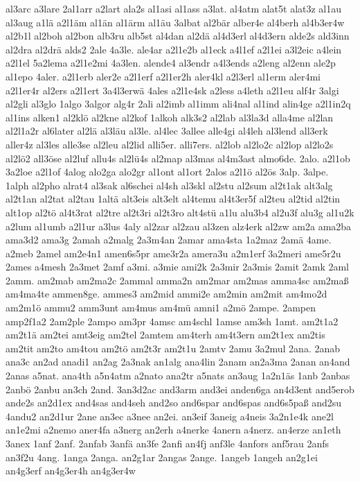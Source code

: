 {al3arc
a3lare
2al1arr
a2lart
ala2s
al1asi
al1ass
a3lat.
al4atm
alat5t
alat3z
al1au
al3aug
a1lä
a2l1äm
al1än
al1ärm
al1äu
3albat
al2bär
alber4e
al4berh
al4b3er4w
al2b1l
al2boh
al2bon
alb3ru
alb5st
al4dan
al2dä
al4d3erl
al4d3ern
alde2s
ald3inn
al2dra
al2drä
alds2
2ale
4a3le.
ale4ar
a2l1e2b
al1eck
a4l1ef
a2l1ei
a3l2eic
a4lein
a2l1el
5a2lema
a2l1e2mi
4a3len.
alende4
al3endr
a4l3ends
a2leng
al2enn
ale2p
al1epo
4aler.
a2l1erb
aler2e
a2l1erf
a2l1er2h
aler4kl
a2l3erl
al1erm
aler4mi
a2l1er4r
al2ers
a2l1ert
3a4l3erwä
4ales
a2l1e4sk
a2less
a4leth
a2l1eu
alf4r
3algi
al2gli
al3glo
1algo
3algor
alg4r
2ali
al2imb
al1imm
ali4nal
al1ind
alin4ge
a2l1in2q
al1ins
alken1
al2klö
al2kne
al2kof
1alkoh
alk3s2
al2lab
al3la3d
alla4me
al2lan
al2l1a2r
al6later
al2lä
al3läu
al3le.
al4lec
3allee
alle4gi
al4leh
al3lend
all3erk
aller4z
al3les
alle3se
al2leu
al2lid
alli5er.
alli7ers.
al2lob
al2lo2c
al2lop
al2lo2s
al2lö2
all3öse
al2luf
allu4s
al2lü4s
al2map
al3mas
al4m3ast
almo6de.
2alo.
a2l1ob
3a2loe
a2l1of
4alog
alo2ga
alo2gr
al1ont
al1ort
2alos
a2l1ö
al2ös
3alp.
3alpe.
1alph
al2pho
alrat4
al3sak
al6schei
al4sh
al3skl
al2stu
al2sum
al2t1ak
alt3alg
al2t1an
al2tat
al2tau
1altä
alt3eis
alt3elt
al4temu
al4t3er5f
al2teu
al2tid
al2tin
alt1op
al2tö
al4t3rat
al2tre
al2t3ri
al2t3ro
alt4stü
a1lu
alu3b4
al2u3f
alu3g
al1u2k
a2lum
al1umb
a2l1ur
a3lus
4aly
al2zar
al2zau
al3zen
alz4erk
al2zw
am2a
ama2ba
ama3d2
ama3g
2amah
a2malg
2a3m4an
2amar
ama4sta
1a2maz
2amä
4ame.
a2meb
2amel
am2e4n1
amen6s5pr
ame3r2a
amera3u
a2m1erf
3a2meri
ame5r2u
2ames
a4mesh
2a3met
2amf
a3mi.
a3mie
ami2k
2a3mir
2a3mis
2amit
2amk
2aml
2amm.
am2mab
am2ma2c
2ammal
amma2n
am2mar
am2mas
amma4sc
am2maß
am4ma4te
ammen8ge.
ammes3
am2mid
ammi2e
am2min
am2mit
am4mo2d
am2m1ö
ammu2
amm3unt
am4mus
am4mü
amni1
a2mö
2ampe.
2ampen
amp2f1a2
2am2ple
2ampo
am3pr
4amsc
am4schl
1amse
am3sh
1amt.
am2t1a2
am2t1ä
am2tei
amt3eig
am2tel
2amtem
am4terh
am4t3ern
am2t1ex
am2tis
am2tit
am2to
am4tou
am2tö
am2t3r
am2t1u
2amtv
2amu
3a2mul
2ana.
2anab
ana3c
an2ad
anadi1
an2ag
2a3nak
an1alg
ana4lin
2anam
an2a3ma
2anan
an4and
2anas
a5nat.
ana4th
a5n4atm
a2nato
ana2tr
a5nats
an3aug
1a2n1äs
1anb
2anbas
2anbö
2anbu
an3ch
2and.
3an3d2ac
and3arm
and3ei
anden6ga
an4d3ent
and5erob
ande2s
an2d1ex
and4sas
and4seh
and2so
and6spar
and6spas
and6s5paß
and2su
4andu2
an2d1ur
2ane
an3ec
a3nee
an2ei.
an3eif
3aneig
a4neis
3a2n1e4k
ane2l
an1e2mi
a2nemo
aner4fa
a3nerg
an2erh
a4nerke
4anern
a4nerz.
an4erze
an1eth
3anex
1anf
2anf.
2anfab
3anfä
an3fe
2anfi
an4fj
anf3le
4anfors
anf5rau
2anfs
an3f2u
4ang.
1anga
2anga.
an2g1ar
2angas
2ange.
1angeb
1angeh
an2g1ei
an4g3erf
an4g3er4h
an4g3er4w
}
